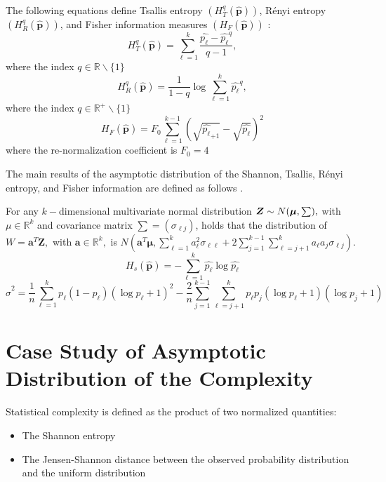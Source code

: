 The following equations define Tsallis entropy $	(H_{T}^{q}(\widehat{\bm{p}}))$, Rényi entropy $(H_{R}^{q}(\widehat{\bm{p}}))$, and Fisher information measures $(H_{F}(\widehat{\bm{p}}))$ \cite{sanchez2009discrete} :
\begin{equation}
	H_{T}^{q}(\widehat{\bm{p}})=\sum_{\ell=1}^{k}\dfrac{\widehat{p_\ell}-\widehat{p_\ell}^q}{q-1},
\end{equation}
where the index $q\in \mathbb{R}\backslash \{1\}$
\begin{equation}
	H_{R}^{q}(\widehat{\bm{p}})=\dfrac{1}{1-q} \log \sum_{\ell=1}^{k}{\widehat{p_\ell}}^q,
\end{equation}
where the index $q\in \mathbb{R}^{+}\backslash \{1\}$
\begin{equation}
	H_F(\widehat{\bm{p}})=F_0\sum_{\ell=1}^{k-1}(\sqrt{\widehat{p_\ell}_{+1}}-\sqrt{\widehat{p_\ell}})^2
\end{equation}
where the re-normalization coefficient is $F_0=4$ \cite{sanchez2009discrete}

The main results of the asymptotic distribution of the Shannon, Tsallis, Rényi entropy, and Fisher information are defined as follows \cite{Rey2023}. 

For any $k-$dimensional multivariate normal distribution $\bm{Z}\sim \normalsize N(\bm{\mu},\sum),$ with $\mu \in \mathbb{R}^k$ and covariance matrix $\sum=(\sigma_{{\ell}{j}})$, holds that the distribution of $W=\bm{a}^T\bm{Z},$ with $\bm{a} \in \mathbb{R}^k,$ is $N(\bm{a}^T\bm{\mu},\sum_{\ell=1}^{k}a_\ell^2 \sigma_{{\ell}{\ell}}+2\sum_{j=1}^{k-1}\sum_{\ell=j+1}^{k} a_\ell a_j\sigma_{{\ell}{j}})$. 
\begin{equation}
	H_s(\widehat{\bm{p}})=-\sum_{\ell=1}^{k}\widehat{p_\ell}\log\widehat{p_\ell}
\end{equation}
\begin{equation}
	\widehat{\sigma}^2=\dfrac{1}{n}\sum_{\ell=1}^{k}p_\ell(1-p_\ell)(\log p_\ell+1)^2-\dfrac{2}{n}\sum_{j=1}^{k-1}\sum_{\ell=j+1}^{k}p_\ell p_j(\log p_\ell+1)(\log p_j+1)
\end{equation}
	   
\section{Case Study of Asymptotic Distribution of the Complexity} 

Statistical complexity is defined as the product of two normalized quantities:
\begin{itemize}
	\item The Shannon entropy
	\item The Jensen-Shannon distance between the observed probability distribution and the uniform distribution 
\end{itemize}

